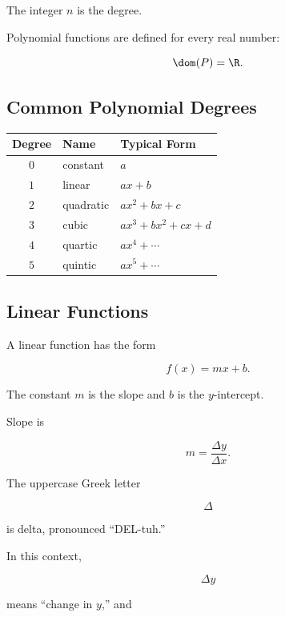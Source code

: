 The integer \(n\) is the degree.

Polynomial functions are defined for every real number:

\[ \dom(P)=\R. \]

\subsection{Common Polynomial Degrees}
\label{subsec:common-polynomials}

\begin{center}
\begin{tabularx}{0.8\textwidth}{@{}clX@{}}
\toprule
\textbf{Degree} & \textbf{Name} & \textbf{Typical Form}\\
\midrule
\(0\) & constant & \(a\)\\
\(1\) & linear & \(ax+b\)\\
\(2\) & quadratic & \(ax^2+bx+c\)\\
\(3\) & cubic & \(ax^3+bx^2+cx+d\)\\
\(4\) & quartic & \(ax^4+\cdots\)\\
\(5\) & quintic & \(ax^5+\cdots\)\\
\bottomrule
\end{tabularx}
\end{center}

\subsection{Linear Functions}
\label{subsec:linear-functions-analysis}

A linear function has the form

\[ f(x)=mx+b. \]

The constant \(m\) is the slope and \(b\) is the \(y\)-intercept.

Slope is

\[ m=\frac{\Delta y}{\Delta x}. \]

The uppercase Greek letter

\[ \Delta \]

is delta, pronounced ``DEL-tuh.''

In this context,

\[ \Delta y \]

means ``change in \(y\),'' and

